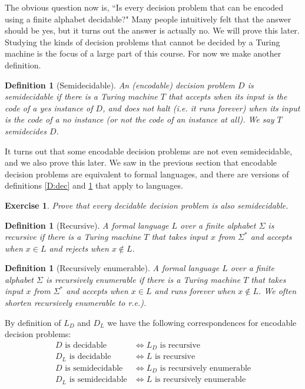 \documentclass{article}
\theoremstyle{plain}
\newtheorem{definition}[theorem]{Definition}{\bfseries}{\upshape}
\newtheorem{exercise}[theorem]{Exercise}{\bfseries}{\upshape}
\begin{document}
The obvious question now is, ``Is every decision problem that can be encoded using a finite alphabet decidable?" Many people intuitively felt that the answer should be yes, but it turns out the answer is actually no. We will prove this later. Studying the kinds of decision problems that cannot be decided by a Turing machine is the focus of a large part of this course. For now we make another definition.

\begin{definition}[Semidecidable]\label{D:semidec}
An (encodable) decision problem $D$ is semidecidable if there is a Turing machine $T$ that accepts when its input is the code of a yes instance of $D$, and does not halt (i.e. it runs forever) when its input is the code of a no instance (or not the code of an instance at all). We say $T$ semidecides $D$.
\end{definition}  

It turns out that some encodable decision problems are not even semidecidable, and we also prove this later. We saw in the previous section that encodable decision problems are equivalent to formal languages, and there are versions of definitions \ref{D:dec} and \ref{D:semidec} that apply to languages.


\begin{exercise}
Prove that every decidable decision problem is also semidecidable.
\end{exercise}

\begin{definition}[Recursive]
A formal language $L$ over a finite alphabet $\Sigma$ is recursive if there is a Turing machine $T$ that takes input $x$ from $\Sigma^*$ and accepts when $x\in L$ and rejects when $x\notin L$.  
\end{definition}

\begin{definition}[Recursively enumerable]
A formal language $L$ over a finite alphabet $\Sigma$ is recursively enumerable if there is a Turing machine $T$ that takes input $x$ from $\Sigma^*$ and accepts when $x\in L$ and runs forever when $x\notin L$. We often shorten \emph{recursively enumerable} to \emph{r.e.}).  
\end{definition}

By definition of $L_D$ and $D_L$ we have the following correspondences for encodable decision problems:
\begin{align*}
D \text{ is decidable}&\iff L_D \text{ is recursive}\\
D_L \text{ is decidable}&\iff L \text{ is recursive}\\
D \text{ is semidecidable}&\iff L_D \text{ is recursively enumerable}\\
D_L \text{ is semidecidable}&\iff L \text{ is recursively enumerable}\\
\end{align*} 
\end{document}
